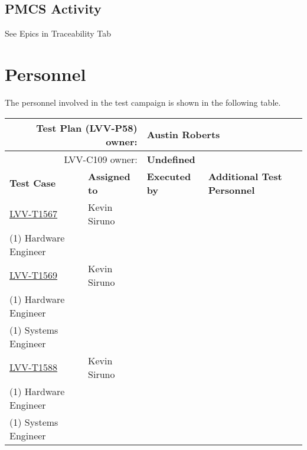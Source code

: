 \documentclass[SE,lsstdraft,STR,toc]{lsstdoc}
\begin{document}
  \subsection{PMCS Activity}
  See Epics in Traceability Tab


\newpage
\section{Personnel}
\label{sect:personnel}

The personnel involved in the test campaign is shown in the following table.

\begin{longtable}{p{3cm}p{3cm}p{3cm}p{6cm}}
\hline
\multicolumn{2}{r}{Test Plan (LVV-P58) owner:} &
\multicolumn{2}{l}{\textbf{ Austin Roberts } }\\\hline
\multicolumn{2}{r}{ LVV-C109 owner:} &
\multicolumn{2}{l}{\textbf{
    Undefined
}
} \\\hline
\textbf{Test Case} & \textbf{Assigned to} & \textbf{Executed by} & \textbf{Additional Test Personnel} \\ \hline
\href{https://jira.lsstcorp.org/secure/Tests.jspa#/testCase/LVV-T1567}{LVV-T1567}
& {\small Kevin Siruno } & {\small  } &
\begin{minipage}[]{6cm}
\smallskip
{\small (1) Software Engineer\\
(1) Hardware Engineer
 }
\medskip
\end{minipage}
\\ \hline
\href{https://jira.lsstcorp.org/secure/Tests.jspa#/testCase/LVV-T1569}{LVV-T1569}
& {\small Kevin Siruno } & {\small  } &
\begin{minipage}[]{6cm}
\smallskip
{\small (1) Software Engineer\\
(1) Hardware Engineer\\
(1) Systems Engineer
 }
\medskip
\end{minipage}
\\ \hline
\href{https://jira.lsstcorp.org/secure/Tests.jspa#/testCase/LVV-T1588}{LVV-T1588}
& {\small Kevin Siruno } & {\small  } &
\begin{minipage}[]{6cm}
\smallskip
{\small (1) Software Engineer\\
(1) Hardware Engineer\\
(1) Systems Engineer
 }
\medskip
\end{minipage}
\\ \hline
\end{longtable}
\end{document}
